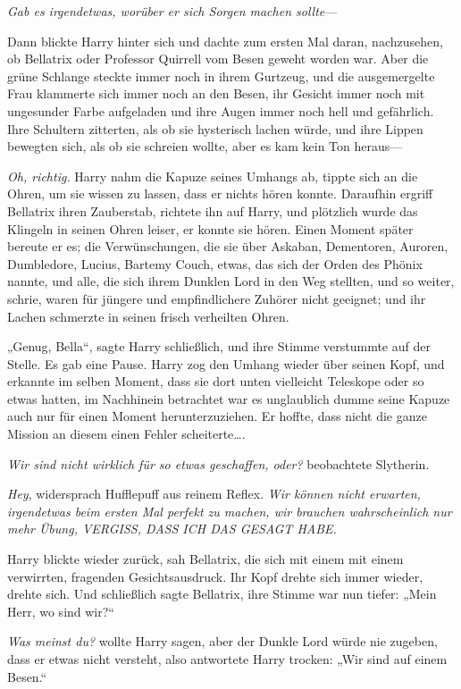 {\emph{Gab es irgendetwas, worüber er sich Sorgen machen sollte}—

Dann blickte Harry hinter sich und dachte zum ersten Mal daran, nachzusehen, ob Bellatrix oder Professor Quirrell vom Besen geweht worden war. Aber die grüne Schlange steckte immer noch in ihrem Gurtzeug, und die ausgemergelte Frau klammerte sich immer noch an den Besen, ihr Gesicht immer noch mit ungesunder Farbe aufgeladen und ihre Augen immer noch hell und gefährlich. Ihre Schultern zitterten, als ob sie hysterisch lachen würde, und ihre Lippen bewegten sich, als ob sie schreien wollte, aber es kam kein Ton heraus—

\emph{Oh, richtig.} Harry nahm die Kapuze seines Umhangs ab, tippte sich an die Ohren, um sie wissen zu lassen, dass er nichts hören konnte. Daraufhin ergriff Bellatrix ihren Zauberstab, richtete ihn auf Harry, und plötzlich wurde das Klingeln in seinen Ohren leiser, er konnte sie hören. Einen Moment später bereute er es; die Verwünschungen, die sie über Askaban, Dementoren, Auroren, Dumbledore, Lucius, Bartemy Couch, etwas, das sich der Orden des Phönix nannte, und alle, die sich ihrem Dunklen Lord in den Weg stellten, und so weiter, schrie, waren für jüngere und empfindlichere Zuhörer nicht geeignet; und ihr Lachen schmerzte in seinen frisch verheilten Ohren.

„Genug, Bella“, sagte Harry schließlich, und ihre Stimme verstummte auf der Stelle. Es gab eine Pause. Harry zog den Umhang wieder über seinen Kopf, und erkannte im selben Moment, dass sie dort unten vielleicht Teleskope oder so etwas hatten, im Nachhinein betrachtet war es unglaublich dumme seine Kapuze auch nur für einen Moment herunterzuziehen. Er hoffte, dass nicht die ganze Mission an diesem einen Fehler scheiterte….

\emph{Wir sind nicht wirklich für so etwas geschaffen, oder?} beobachtete Slytherin.

\emph{Hey}, widersprach Hufflepuff aus reinem Reflex. \emph{Wir können nicht erwarten, irgendetwas beim ersten Mal perfekt zu machen, wir brauchen wahrscheinlich nur mehr Übung, VERGISS, DASS ICH DAS GESAGT HABE.}

Harry blickte wieder zurück, sah Bellatrix, die sich mit einem mit einem verwirrten, fragenden Gesichtsausdruck. Ihr Kopf drehte sich immer wieder, drehte sich. Und schließlich sagte Bellatrix, ihre Stimme war nun tiefer: „Mein Herr, wo sind wir?“

\emph{Was meinst du?} wollte Harry sagen, aber der Dunkle Lord würde nie zugeben, dass er etwas nicht versteht, also antwortete Harry trocken: „Wir sind auf einem Besen.“

}
